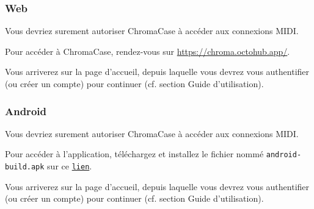 \subsubsection{Web}

Vous devriez surement autoriser ChromaCase à accéder aux connexions MIDI.

Pour accéder à ChromaCase, rendez-vous sur \url{https://chroma.octohub.app/}.

Vous arriverez sur la page d'accueil, depuis laquelle vous devrez vous authentifier (ou créer un compte) pour continuer (cf. section Guide d'utilisation).

\subsubsection{Android}

Vous devriez surement autoriser ChromaCase à accéder aux connexions MIDI.

Pour accéder à l'application, téléchargez et installez le fichier nommé \texttt{android-build.apk} sur ce \href{https://github.com/Chroma-Case/Chromacase/releases}{\texttt{lien}}.

Vous arriverez sur la page d'accueil, depuis laquelle vous devrez vous authentifier (ou créer un compte) pour continuer (cf. section Guide d'utilisation).
